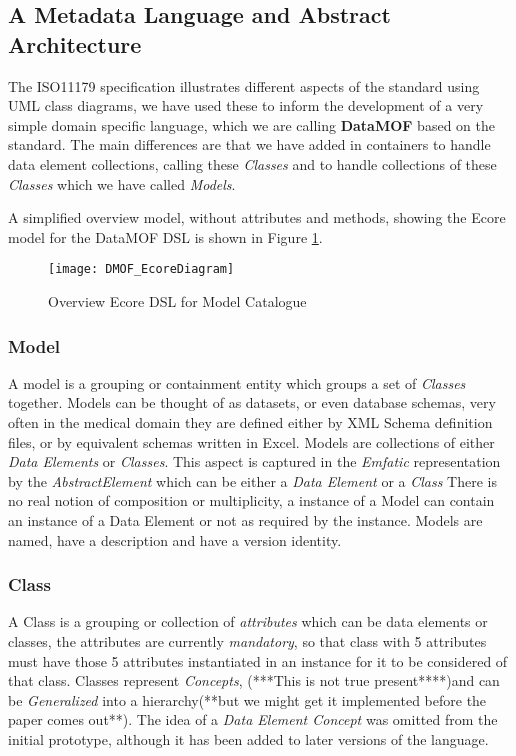 \subsection{A Metadata Language and Abstract Architecture }

The ISO11179 specification illustrates different aspects of the standard using UML class diagrams, we have used these to inform the development of a very simple domain specific language, which we are calling \textbf{DataMOF} based on the standard. The main differences are that we have added in containers to handle data element collections, calling these \emph{Classes} and to handle collections of these \emph{Classes} which we have called \emph{Models}.

A simplified overview model, without attributes and methods, showing the Ecore model for the DataMOF DSL is shown in Figure \ref{fig:mcSimplifiedOverview}.

\begin{figure}[here]
	\texttt{[image: DMOF\_EcoreDiagram]}
	\caption{Overview Ecore DSL for Model Catalogue} 
	\label{fig:mcSimplifiedOverview}
\end{figure}

\subsubsection{Model}
A model is a grouping or containment entity which groups a set of \emph{Classes} together. Models can be thought of as datasets, or even database schemas, very often in the medical domain they are defined either by XML Schema definition files, or by equivalent schemas written in Excel. 
Models are collections of either \emph{Data Elements} or \emph{Classes}. This aspect is captured in the \emph{Emfatic} representation by the \emph{AbstractElement} which can be either a  \emph{Data Element} or a \emph{Class}  There is no real notion of composition or multiplicity, a instance of a Model can contain an instance of a Data Element or not as required by the instance.  Models are named, have a description and have a version identity.
\subsubsection{Class}
A Class is a grouping or collection of \emph{attributes} which can be data elements or classes, the attributes are currently \emph{mandatory}, so that class with 5 attributes must have those 5 attributes instantiated in an instance for it to be considered of that class. Classes represent \emph{Concepts}, (***This is not true present****)and can be \emph{Generalized} into a hierarchy(**but we might get it implemented before the paper comes out**). The idea of a \emph{Data Element Concept} was omitted from the initial prototype, although it has been added to later versions of the language.
